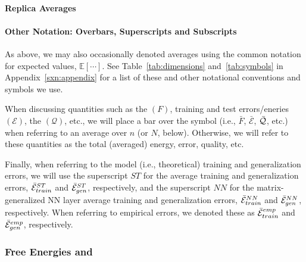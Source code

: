\paragraph{Replica Averages}

\paragraph{Other Notation: Overbars, Superscripts and Subscripts}
As above, we may also occasionally denoted averages using the common notation for expected values, $\mathbb{E}[\cdots]$.
See Table~\ref{tab:dimensions} and~\ref{tab:symbols} in Appendix~\ref{sxn:appendix} for a list of these and other notational conventions and symbols we use.

When discussing quantities such as the \FreeEnergy $(F)$, 
training and test errors/eneries $(\mathcal{E})$, 
the \LayerQuality $(\mathcal{Q})$, etc.,
we will place a bar over the symbol (i.e., $\bar{F}$, $\bar{\mathcal{E}}$, $\bar{\mathcal{Q}}$, etc.) when referring to
an average over $n$ (or $N$, below). 
Otherwise, we will refer to these quantities as the total (averaged) energy, error, quality, etc.


Finally, when referring to the model (i.e., theoretical)
training and generalization errors, we will use the superscript $ST$ for
the average \StudentTeacher training and generalization errors, $\bar{\mathcal{E}}^{ST}_{train}$ and $\bar{\mathcal{E}}^{ST}_{gen}$, respectively, and
the superscript $NN$ for the matrix-generalized NN layer average
training and generalization errors, $\bar{\mathcal{E}}^{NN}_{train}$ and $\bar{\mathcal{E}}^{NN}_{gen}$, respectively.
When referring to empirical errors, we denoted these as $\bar{\mathcal{E}}^{emp}_{train}$ and $\bar{\mathcal{E}}^{emp}_{gen}$, respectively.


\subsubsection{Free Energies and \GeneratingFunctions} 
\label{sxn:mathP_free_energies}

